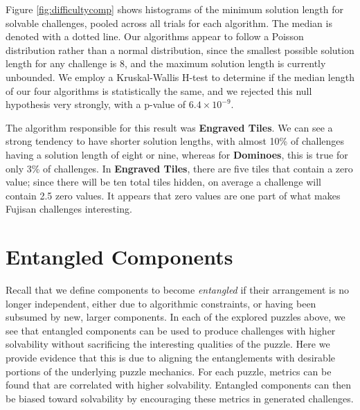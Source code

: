\documentclass[journal]{IEEEtran}
\begin{document}
Figure \ref{fig:difficultycomp} shows histograms of the minimum solution length for solvable challenges, pooled across all trials for each algorithm. The median is denoted with a dotted line. Our algorithms appear to follow a Poisson distribution rather than a normal distribution, since the smallest possible solution length for any challenge is 8, and the maximum solution length is currently unbounded. We employ a Kruskal-Wallis H-test \cite{KRUSKAL} to determine if the median length of our four algorithms is statistically the same, and we rejected this null hypothesis very strongly, with a p-value of $6.4 \times 10^{-9}$.

The algorithm responsible for this result was {\bf Engraved Tiles}. We can see a strong tendency to have shorter solution lengths, with almost 10\% of challenges having a solution length of eight or nine, whereas for {\bf Dominoes}, this is true for only 3\% of challenges. In {\bf Engraved Tiles}, there are five tiles that contain a zero value; since there will be ten total tiles hidden, on average a challenge will contain 2.5 zero values. It appears that zero values are one part of what makes Fujisan challenges interesting.


%


%

\section{Entangled Components}
\label{entangled}


%

%
%
%
%
%
%
%
%
%
%
%
%

%
%


%
%
%
%
%
%
%
%
%
%
%
%
%

%
\noindent
Recall that we define components to become {\it entangled} if their arrangement is no longer independent, either due to algorithmic constraints, or having been subsumed by new, larger components. In each of the explored puzzles above, we see that entangled components can be used to produce challenges with higher solvability without sacrificing the interesting qualities of the puzzle. Here we provide evidence that this is due to aligning the entanglements with desirable portions of the underlying puzzle mechanics. For each puzzle, metrics can be found that are correlated with higher solvability. Entangled components can then be biased toward solvability by encouraging these metrics in generated challenges.

%
\end{document}
